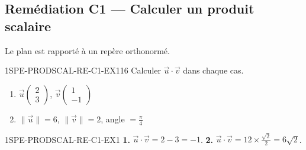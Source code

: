 
\subsection*{Remédiation C1 — Calculer un produit scalaire}

Le plan est rapporté à un repère orthonormé.

\begin{exercice}{1SPE-PRODSCAL-RE-C1-EX1}{1}{6}
Calculer $\vec{u} \cdot \vec{v}$ dans chaque cas.
\begin{enumerate}
  \item $\vec{u}\begin{pmatrix} 2 \\ 3 \end{pmatrix}$, $\vec{v}\begin{pmatrix} 1 \\ -1 \end{pmatrix}$
  \item $\|\vec{u}\| = 6$, $\|\vec{v}\| = 2$, angle $= \frac{\pi}{4}$
\end{enumerate}
\end{exercice}


\begin{corrige}{1SPE-PRODSCAL-RE-C1-EX1}
\textbf{1.} $\vec{u} \cdot \vec{v} = 2 - 3 = -1$. \textbf{2.} $\vec{u} \cdot \vec{v} = 12 \times \frac{\sqrt{2}}{2} = 6\sqrt{2}$.
\end{corrige}

